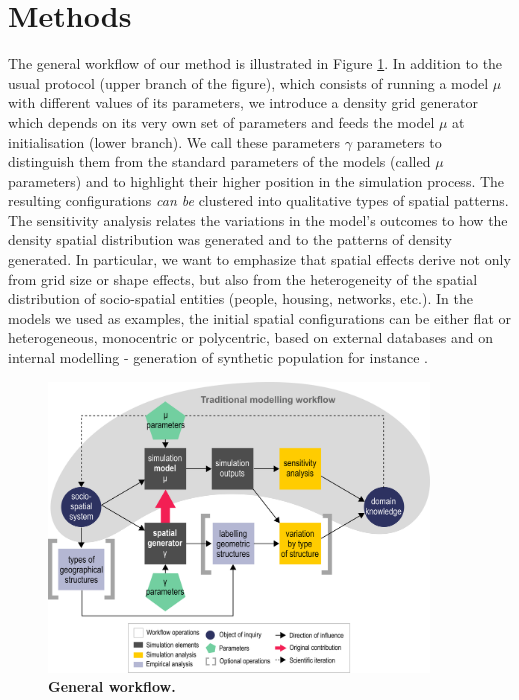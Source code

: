 \documentclass{JASSS}
\begin{document}
 




\section{Methods}
The general workflow of our method is illustrated in Figure \ref{fig:method}. In addition to the usual protocol (upper branch of the figure), which consists of running a model $\mu$ with different values of its parameters, we introduce a density grid generator which depends on its very own set of parameters and feeds the model $\mu$ at initialisation (lower branch). We call these parameters  $\gamma$ parameters to distinguish them from the standard parameters of the models (called $\mu$ parameters) and to highlight their higher position in the simulation process. The resulting configurations \emph{can be} clustered into qualitative types of spatial patterns. The sensitivity analysis relates the variations in the model's outcomes to how the density spatial distribution was generated and to the patterns of density generated. In particular, we want to emphasize that spatial effects derive not only from grid size or shape effects, but also from the heterogeneity of the spatial distribution of socio-spatial entities (people, housing, networks, etc.). In the models we used as examples, the initial spatial configurations can be either flat or heterogeneous, monocentric or polycentric, based on external databases and on internal modelling - generation of synthetic population for instance \citep{bhat1999activity}.
\begin{figure}[!t]
\centering
\includegraphics[width=0.9\textwidth]{figures/Fig1_v2.png}
\caption{\textbf{General workflow.}} \label{fig:method}
\end{figure} %
\end{document}
